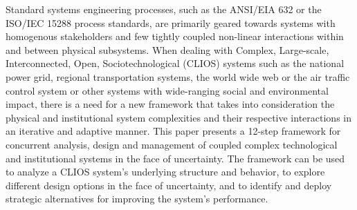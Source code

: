 Standard systems engineering processes, such as the ANSI/EIA 632 or the ISO/IEC 15288 process standards, are primarily geared towards systems with homogenous stakeholders and few tightly coupled non-linear interactions within and between physical subsystems. When dealing with Complex, Large-scale, Interconnected, Open, Sociotechnological (CLIOS) systems such as the national power grid, regional transportation systems, the world wide web or the air traffic control system or other systems with wide-ranging social and environmental impact, there is a need for a new framework that takes into consideration the physical and institutional system complexities and their respective interactions in an iterative and adaptive manner. This paper presents a 12-step framework for concurrent analysis, design and management of coupled complex technological and institutional systems in the face of uncertainty. The framework can be used to analyze a CLIOS system’s underlying structure and behavior, to explore different design options in the face of uncertainty, and to identify and deploy strategic alternatives for improving the system’s performance.
